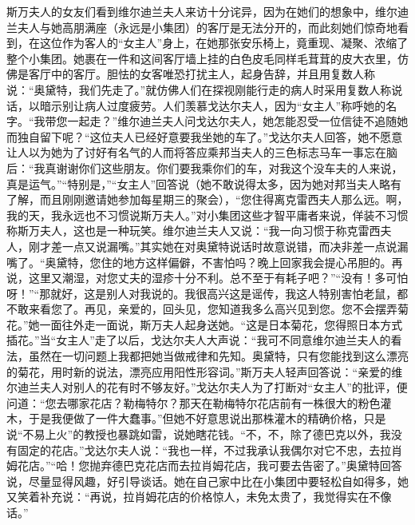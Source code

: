 \par 斯万夫人的女友们看到维尔迪兰夫人来访十分诧异，因为在她们的想象中，维尔迪兰夫人与她高朋满座（永远是小集团）的客厅是无法分开的，而此刻她们惊奇地看到，在这位作为客人的“女主人”身上，在她那张安乐椅上，竟重现、凝聚、浓缩了整个小集团。她裹在一件和这间客厅墙上挂的白色皮毛同样毛茸茸的皮大衣里，仿佛是客厅中的客厅。胆怯的女客唯恐打扰主人，起身告辞，并且用复数人称说：“奥黛特，我们先走了。”就仿佛人们在探视刚能行走的病人时采用复数人称说话，以暗示别让病人过度疲劳。人们羡慕戈达尔夫人，因为“女主人”称呼她的名字。“我带您一起走？”维尔迪兰夫人问戈达尔夫人，她怎能忍受一位信徒不追随她而独自留下呢？“这位夫人已经好意要我坐她的车了。”戈达尔夫人回答，她不愿意让人以为她为了讨好有名气的人而将答应乘邦当夫人的三色标志马车一事忘在脑后：“我真谢谢你们这些朋友。你们要我乘你们的车，对我这个没车夫的人来说，真是运气。”“特别是，”“女主人”回答说（她不敢说得太多，因为她对邦当夫人略有了解，而且刚刚邀请她参加每星期三的聚会），“您住得离克雷西夫人那么远。啊，我的天，我永远也不习惯说斯万夫人。”对小集团这些才智平庸者来说，佯装不习惯称斯万夫人，这也是一种玩笑。维尔迪兰夫人又说：“我一向习惯于称克雷西夫人，刚才差一点又说漏嘴。”其实她在对奥黛特说话时故意说错，而决非差一点说漏嘴了。“奥黛特，您住的地方这样偏僻，不害怕吗？晚上回家我会提心吊胆的。再说，这里又潮湿，对您丈夫的湿疹十分不利。总不至于有耗子吧？”“没有！多可怕呀！”“那就好，这是别人对我说的。我很高兴这是谣传，我这人特别害怕老鼠，都不敢来看您了。再见，亲爱的，回头见，您知道我多么高兴见到您。您不会摆弄菊花。”她一面往外走一面说，斯万夫人起身送她。“这是日本菊花，您得照日本方式插花。”当“女主人”走了以后，戈达尔夫人大声说：“我可不同意维尔迪兰夫人的看法，虽然在一切问题上我都把她当做戒律和先知。奥黛特，只有您能找到这么漂亮的菊花，用时新的说法，漂亮应用阳性形容词。”斯万夫人轻声回答说：“亲爱的维尔迪兰夫人对别人的花有时不够友好。”戈达尔夫人为了打断对“女主人”的批评，便问道：“您去哪家花店？勒梅特尔？那天在勒梅特尔花店前有一株很大的粉色灌木，于是我便做了一件大蠢事。”但她不好意思说出那株灌木的精确价格，只是说“不易上火”的教授也暴跳如雷，说她瞎花钱。“不，不，除了德巴克以外，我没有固定的花店。”戈达尔夫人说：“我也一样，不过我承认我偶尔对它不忠，去拉肖姆花店。”“哈！您抛弃德巴克花店而去拉肖姆花店，我可要去告密了。”奥黛特回答说，尽量显得风趣，好引导谈话。她在自己家中比在小集团中要轻松自如得多，她又笑着补充说：“再说，拉肖姆花店的价格惊人，未免太贵了，我觉得实在不像话。”
